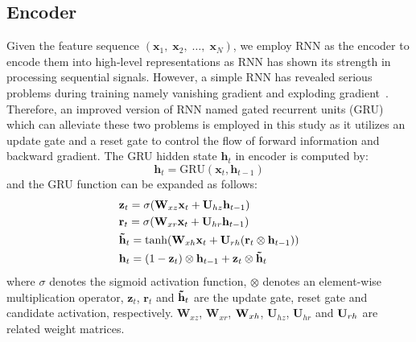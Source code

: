 \documentclass[a4paper,conference]{IEEEtran}
\begin{document}
\subsection{Encoder}
\label{sec:Encoder}
Given the feature sequence $\left( {{\mathbf{x}_1},\;{\mathbf{x}_2},\; \ldots ,\;{\mathbf{x}_N}} \right)$, we employ RNN as the encoder to encode them into high-level representations as RNN has shown its strength in processing sequential signals. However, a simple RNN has revealed serious problems during training namely vanishing gradient and exploding gradient~\cite{bengio1994learning,zhang2016rnn}. Therefore, an improved version of RNN named gated recurrent units (GRU)~\cite{chung2014empirical} which can alleviate these two problems is employed in this study as it utilizes an update gate and a reset gate to control the flow of forward information and backward gradient. The GRU hidden state ${\mathbf{h}_t}$ in encoder is computed by:
\begin{equation}\label{eq:GRU function}
{{\mathbf{h}}_t} = \textrm{GRU} \left( {{\mathbf{x}_t}, {\mathbf{h}_{t - 1}}} \right)
\end{equation}
and the GRU function can be expanded as follows:
\begin{align}\label{eq:expand GRU}
 & {{\mathbf{z}}_t} = \sigma ({{\mathbf{W}}_{xz}}{{\mathbf{x}}_{t}} + {{\mathbf{U}}_{hz}}{{\mathbf{h}}_{t - 1}}) \\
 & {{\mathbf{r}}_t} = \sigma ({{\mathbf{W}}_{xr}}{{\mathbf{x}}_{t}} + {{\mathbf{U}}_{hr}}{{\mathbf{h}}_{t - 1}}) \\
 & {{\bf{\tilde h}}_t} = \tanh ({{\bf{W}}_{xh}}{{\bf{x}}_{t}} + {{\bf{U}}_{rh}}({{\bf{r}}_t} \otimes {{\bf{h}}_{t - 1}})) \\
 & {{\bf{h}}_t} = (1 - {{\bf{z}}_t}) \otimes {{\bf{h}}_{t - 1}} + {{\bf{z}}_t} \otimes {{\bf{\tilde h}}_t}
\end{align}
where $\sigma$ denotes the sigmoid activation function, $\otimes$ denotes an element-wise multiplication operator, ${{\mathbf{z}}_t}$, ${{\mathbf{r}}_t}$ and ${{\bf{\tilde h}}_t}$ are the update gate, reset gate and candidate activation, respectively. ${\mathbf{W}}_{xz}$, ${\mathbf{W}}_{xr}$, ${\bf{W}}_{xh}$, ${\mathbf{U}}_{hz}$, ${\mathbf{U}}_{hr}$ and ${\bf{U}}_{rh}$ are related weight matrices.
\end{document}
